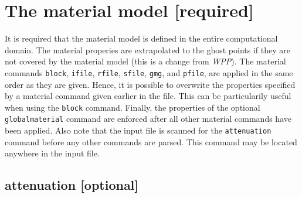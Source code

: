\documentclass[11pt]{report}
\begin{document}

\section{The material model [required]} 

It is required that the material model is defined in the entire computational domain. The material
properies are extrapolated to the ghost points if they are not covered by the material model (this
is a change from \emph{WPP}). The material commands \verb+block+, \verb+ifile+, \verb+rfile+, \verb+sfile+, \verb+gmg+, and
\verb+pfile+, are applied in the same order as they are given. Hence, it is possible to overwrite
the properties specified by a material command given earlier in the file. This can be particularily
useful when using the \verb+block+ command. Finally, the properties of the optional
\verb+globalmaterial+ command are enforced after all other material commands have been applied. Also
note that the input file is scanned for the \verb+attenuation+ command before any other commands are
parsed. This command may be located anywhere in the input file.

\subsection{attenuation [optional]}
\label{keyword:attenuation}
\end{document}
